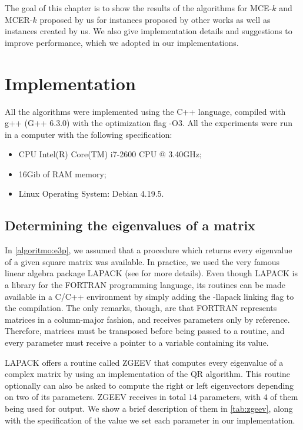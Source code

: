 The goal of this chapter is to show the results of the algorithms for MCE-$k$ and MCER-$k$ proposed by us for instances proposed by other works as well as instances created by us. 
We also give implementation details and suggestions to improve performance, which we adopted in our implementations.

\section{Implementation}

All the algorithms were implemented using the C++ language, compiled with g++ (G++ 6.3.0) with the optimization flag -O3. All the experiments were run in a computer with the following specification:
\begin{itemize}
	\item CPU Intel(R) Core(TM) i7-2600 CPU @ 3.40GHz;
	\item 16Gib of RAM memory;
	\item Linux Operating System: Debian 4.19.5.
\end{itemize}

\subsection{Determining the eigenvalues of a matrix}

In \autoref{algoritmo:e3p}, we assumed that a procedure which returns every eigenvalue of a given square matrix was available. In practice, we used the very famous linear algebra package LAPACK (see  for more details).
Even though LAPACK is a library for the FORTRAN programming language, its routines can be made available in a C/C++ environment by simply adding the -llapack linking flag to the compilation. The only remarks, though, are that FORTRAN represents matrices in a column-major fashion, and receives parameters only by reference. Therefore, matrices must be transposed before being passed to a routine, and every parameter must receive a pointer to a variable containing its value.

LAPACK offers a routine called ZGEEV that computes every eigenvalue of a complex matrix by using an implementation of the QR algorithm. 
This routine optionally can also be asked to compute the right or left eigenvectors depending on two of its parameters. 
ZGEEV receives in total $14$ parameters, with $4$ of them being used for output. We show a brief description of them in \autoref{tab:zgeev}, along with the specification of the value we set each parameter in our implementation.

